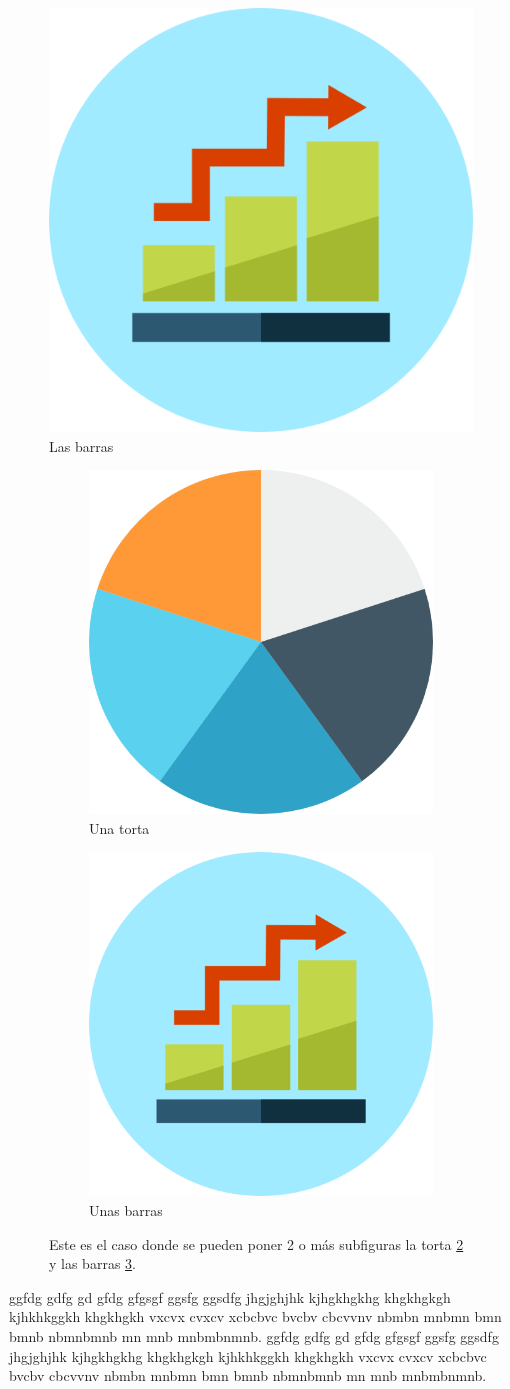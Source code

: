 \documentclass[a4paper, 12pt]{article}
\begin{document}
\begin{flushleft}
		\begin{figure}[h]
			\centering
			\includegraphics[width=0.2\linewidth]{grafica_barras}
			\caption{Las barras}
			\label{fig:barra1}
		\end{figure}
		
		\begin{figure}[h]
			\centering
			\begin{subfigure}{0.45\textwidth}
				\centering
				\includegraphics[width=0.4\linewidth]{grafica_torta}
				\caption{Una torta}
				\label{subtorta1}
			\end{subfigure}\hfil %
			\begin{subfigure}{0.45\textwidth}
				\centering
				\includegraphics[width=0.4\linewidth]{grafica_barras}
				\caption{Unas barras}
				\label{subbarra1}
			\end{subfigure}
			\caption{Este es el caso donde se pueden poner 2 o más subfiguras la torta \ref{subtorta1} y las barras \ref{subbarra1}.}
			\label{fig:Dos subfiguras}
		\end{figure}
		
		ggfdg gdfg gd gfdg gfgsgf ggsfg ggsdfg jhgjghjhk kjhgkhgkhg khgkhgkgh kjhkhkggkh khgkhgkh vxcvx cvxcv xcbcbvc bvcbv cbcvvnv nbmbn mnbmn bmn bmnb nbmnbmnb mn mnb mnbmbnmnb.
		ggfdg gdfg gd gfdg gfgsgf ggsfg ggsdfg jhgjghjhk kjhgkhgkhg khgkhgkgh kjhkhkggkh khgkhgkh vxcvx cvxcv xcbcbvc bvcbv cbcvvnv nbmbn mnbmn bmn bmnb nbmnbmnb mn mnb mnbmbnmnb.
	\end{flushleft}	
	
\end{document}
